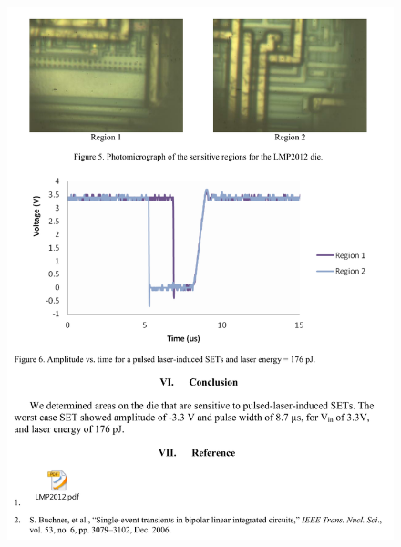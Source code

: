 \documentclass[
	12pt,				%
	openright,			%
	oneside,			%
	a4paper,			%
	english,			%
	french,				%
	spanish,			%
	brazil,				%
	oldfontcommands
	]{abntex2}
\begin{document}
\begin{anexosenv}
	\begin{figure}[th]
		\centering
		\includegraphics[width=0.85\linewidth]{./anexos/lmp2012_4}	
	\end{figure}	
	
	
	
\end{anexosenv}



% 









\printindex
\end{document}
